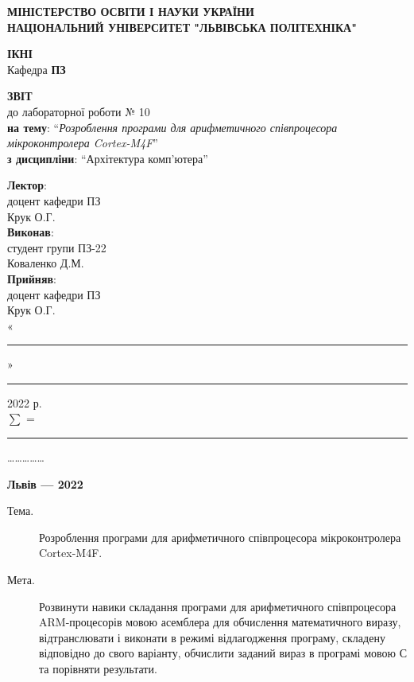 \documentclass{article}
\newcommand\subject{Архітектура комп'ютера}
\newcommand\lecturer{доцент кафедри ПЗ\\Крук О.Г.}
\newcommand\teacher{доцент кафедри ПЗ\\Крук О.Г.}
\newcommand\mygroup{ПЗ-22}
\newcommand\lab{10}
\newcommand\theme{Розроблення програми для арифметичного співпроцесора мікроконтролера Cortex-M4F}
\newcommand\purpose{Розвинути навики складання програми для арифметичного співпроцесора ARM-процесорів мовою асемблера для обчислення математичного виразу, відтранслювати і виконати в режимі відлагодження програму, складену відповідно до свого варіанту, обчислити заданий вираз в програмі мовою С та порівняти результати}
\begin{document}
	\begin{normalsize}
		\begin{titlepage}
			\thispagestyle{empty}
			\begin{center}
				\textbf{МІНІСТЕРСТВО ОСВІТИ І НАУКИ УКРАЇНИ\\
					НАЦІОНАЛЬНИЙ УНІВЕРСИТЕТ "ЛЬВІВСЬКА ПОЛІТЕХНІКА"}
			\end{center}
			\begin{flushright}
				\textbf{ІКНІ}\\
				Кафедра \textbf{ПЗ}
			\end{flushright}
			\vspace{200pt}
			\begin{center}
				\textbf{ЗВІТ}\\
				\vspace{10pt}
				до лабораторної роботи № \lab\\
				\textbf{на тему}: “\textit{\theme}”\\
				\textbf{з дисципліни}: “\subject”
			\end{center}
			\vspace{112pt}
			\begin{flushright}
				
				\textbf{Лектор}:\\
				\lecturer\\
				\vspace{28pt}
				\textbf{Виконав}:\\
				
				студент групи \mygroup\\
				Коваленко Д.М.\\
				\vspace{28pt}
				\textbf{Прийняв}:\\
				
				\teacher\\
				
				\vspace{28pt}
				«\rule{1cm}{0.15mm}» \rule{1.5cm}{0.15mm} 2022 р.\\
				$\sum$ = \rule{1cm}{0.15mm}……………\\
				
			\end{flushright}
			\vspace{\fill}
			\begin{center}
				\textbf{Львів — 2022}
			\end{center}
		\end{titlepage}
		
		\begin{description}
			\item[Тема.] \theme.
			\item[Мета.] \purpose.
		\end{description}
		

\end{normalsize}
\end{document}
